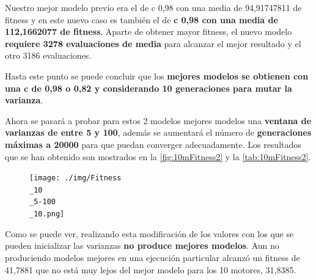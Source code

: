 \documentclass[12pt, spanish, pdftex]{UC3M_document}
\begin{document}
Nuestro mejor modelo previo era el de c 0,98 con una media de 94,91747811 de fitness y en este nuevo caso es también el de \textbf{c 0,98 con una media de 112,1662077 de fitness}. Aparte de obtener mayor fitness, el nuevo modelo \textbf{requiere 3278 evaluaciones de media} para alcanzar el mejor resultado y el otro 3186 evaluaciones.

Hasta este punto se puede concluir que los \textbf{mejores modelos se obtienen con una c de 0,98 o 0,82 y considerando 10 generaciones para mutar la varianza}.
\pagebreak

Ahora se pasará a probar para estos 2 modelos mejores modelos una \textbf{ventana de varianzas de entre 5 y 100}, además se aumentará el número de \textbf{generaciones máximas a 20000} para que puedan converger adecuadamente. Los resultados que se han obtenido son mostrados en la \autoref{fig:10mFitness2} y la \autoref{tab:10mFitness2}.
\begin{figure}[H]
	{\texttt{[image: ./img/Fitness\\\_10\\\_5-100\\\_10.png]}}
\end{figure}
\begin{table}[H]
	\centering
	\caption{Fitness 10 motores, varianzas 5-100 y c considerando 10 generaciones}
	\label{tab:10mFitness2}
	\end{table}

Como se puede ver, realizando esta modificación de los valores con los que se pueden inicializar las varianzas \textbf{no produce mejores modelos}. Aun no produciendo modelos mejores en una ejecución particular alcanzó un fitness de 41,7881 que no está muy lejos del mejor modelo para los 10 motores, 31,8385.
\end{document}
